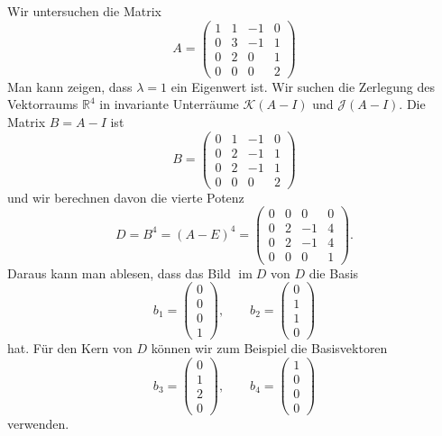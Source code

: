 \begin{beispiel}
Wir untersuchen die Matrix
\[
A
=
\begin{pmatrix}
1&1&-1&0\\
0&3&-1&1\\
0&2& 0&1\\
0&0& 0&2
\end{pmatrix}
\]
Man kann zeigen, dass $\lambda=1$ ein Eigenwert ist.
Wir suchen die Zerlegung des Vektorraums $\mathbb{R}^4$ in invariante
Unterräume $\mathcal{K}(A-I)$ und $\mathcal{J}(A-I)$.
Die Matrix $B=A-I$ ist
\[
B
=
\begin{pmatrix}
0&1&-1&0\\
0&2&-1&1\\
0&2&-1&1\\
0&0& 0&2
\end{pmatrix}
\]
und wir berechnen davon die vierte Potenz
\[
D=B^4=(A-E)^4
=
\begin{pmatrix}
0&0& 0&0\\
0&2&-1&4\\
0&2&-1&4\\
0&0& 0&1
\end{pmatrix}.
\]
Daraus kann man ablesen, dass das Bild $\operatorname{im}D$
von $D$ die Basis
\[
b_1
=
\begin{pmatrix}
0\\0\\0\\1
\end{pmatrix}
, \qquad
b_2
=
\begin{pmatrix}
0\\1\\1\\0
\end{pmatrix}
\]
hat.
Für den Kern von $D$ können wir zum Beispiel die Basisvektoren
\[
b_3
=
\begin{pmatrix}
0\\1\\2\\0
\end{pmatrix}
,\qquad
b_4
=
\begin{pmatrix}
1\\0\\0\\0
\end{pmatrix}
\]
verwenden.


\end{beispiel}
